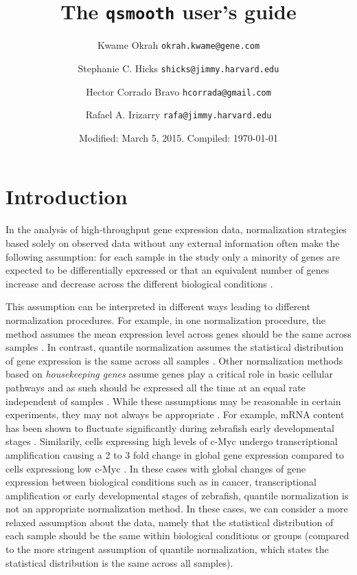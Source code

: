 \documentclass{article}\usepackage[]{graphicx}\usepackage[usenames,dvipsnames]{color}
\title{The \texttt{qsmooth} user's guide}
\author{Kwame Okrah \texttt{okrah.kwame@gene.com} \and
Stephanie C. Hicks \texttt{shicks@jimmy.harvard.edu} \and
Hector Corrado Bravo \texttt{hcorrada@gmail.com} \and
Rafael A. Irizarry \texttt{rafa@jimmy.harvard.edu} }
\date{Modified: March 5, 2015.  Compiled: \today}
\begin{document}
\maketitle
 
\tableofcontents

\section{Introduction}

In the analysis of high-throughput gene expression data, 
normalization strategies based solely on observed data 
without any external information often make the following assumption: 
for each sample in the study only a minority of genes are expected to be 
differentially epxressed or that an equivalent number of genes increase 
and decrease across the different biological conditions 
\cite{aanes2014normalization}.

This assumption can be interpreted in different ways 
leading to different normalization procedures.
For example, in one normalization procedure, the method assumes 
the mean expression level across genes should be the same across samples 
\cite{robinson2010scaling}. In contrast, 
quantile normalization assumes the statistical distribution of gene expression 
is the same across all samples \cite{bolstad2003comparison}. 
Other normalization methods based on {\it housekeeping genes} assume genes 
play a critical role in basic cellular pathways and as such should be 
expressed all the time at an equal rate independent of samples
\cite{eisenberg2013human}.
While these assumptions may be reasonable in certain experiments, 
they may not always be appropriate \cite{loven2012revisiting, hicks}.
For example, mRNA content has been shown to fluctuate significantly 
during zebrafish early developmental stages \cite{aanes2014normalization}.
Similarily, cells expressing high levels of c-Myc undergo 
transcriptional amplification causing a 2 to 3 fold change in global 
gene expression compared to cells expressiong low c-Myc 
\cite{loven2012revisiting}. In these cases with global changes of 
gene expression between biological conditions such as in cancer, 
transcriptional amplification or early developmental stages of zebrafish, 
quantile normalization is not an appropriate normalization method. In 
these cases, we can consider a more relaxed assumption about the data, namely
that the statistical distribution of each sample should be the same 
within biological conditions or groups (compared to the more stringent 
assumption of quantile normalization, which states the statistical 
distribution is the same across all samples).
\end{document}
